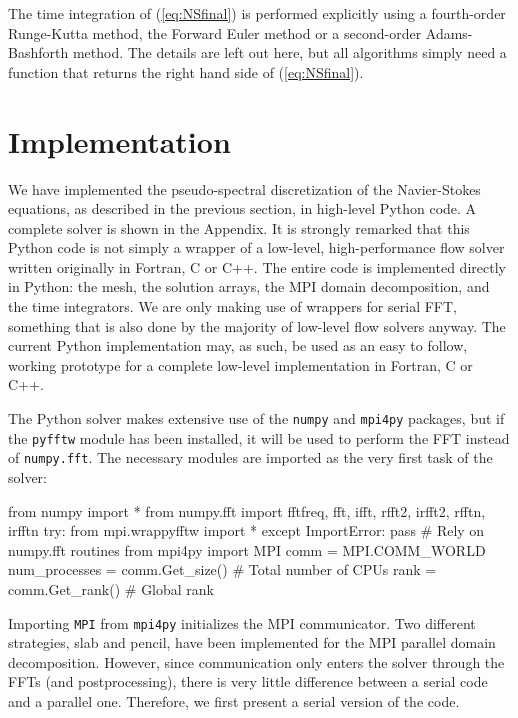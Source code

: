 \documentclass[11pt, oneside]{article}
\begin{document}
The time integration of (\ref{eq:NSfinal}) is performed explicitly using a fourth-order Runge-Kutta method, the Forward Euler method or a second-order Adams-Bashforth method. The details are left out here, but all algorithms simply need a function that returns the right hand side of (\ref{eq:NSfinal}).

\section{Implementation}

We have implemented the pseudo-spectral discretization of the Navier-Stokes equations, as described in the previous section, in high-level Python code. A complete solver is shown in the Appendix. It is strongly remarked that this Python code is not simply a wrapper of a low-level, high-performance flow solver written originally in Fortran, C or C++. The entire code is implemented directly in Python: the mesh, the solution arrays, the MPI domain decomposition, and the time integrators. We are only making use of wrappers for serial FFT, something that is also done by the majority of low-level flow solvers anyway. The current Python implementation may, as such, be used as an easy to follow, working prototype for a complete low-level implementation in Fortran, C or C++.

The Python solver makes extensive use of the \texttt{numpy} and \texttt{mpi4py} packages, but if the \texttt{pyfftw} module has been installed, it will be used to perform the FFT instead of \texttt{numpy.fft}. The necessary modules are imported as the very first task of the solver:

\begin{python}
from numpy import *
from numpy.fft import fftfreq, fft, ifft, rfft2, irfft2, rfftn, irfftn
try:
    from mpi.wrappyfftw import *
except ImportError:
    pass # Rely on numpy.fft routines
from mpi4py import MPI
comm = MPI.COMM_WORLD
num_processes = comm.Get_size() # Total number of CPUs
rank = comm.Get_rank()          # Global rank
\end{python}
Importing \texttt{MPI} from \texttt{mpi4py} initializes the MPI communicator. Two different strategies, slab and pencil, have been implemented for the MPI parallel domain decomposition. However, since communication only enters the solver through the FFTs (and postprocessing), there is very little difference between a serial code and a parallel one. Therefore, we first present a serial version of the code.
\end{document}
